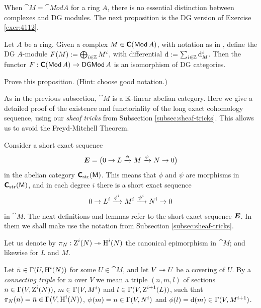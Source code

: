 When $\cat{M} = \cat{Mod} A$ for a ring $A$, there is no essential distinction 
between complexes and DG modules. The next proposition is the DG version of 
Exercise \ref{exer:4112}. 

\begin{prop} \label{prop:1065}
Let $A$ be a ring. Given a complex 
$M \in \boldsymbol{\mathsf{C}}(\operatorname{\mathsf{Mod}} A)$, with notation as in \tup{(\ref{eqn:1065})}, 
define the DG $A$-module 
$F(M) := \bigoplus_{i \in \mathbb{Z}} M^i$,
with differential $\mathrm{d} := \sum_{i \in \mathbb{Z}} \mathrm{d}_M^i$. Then the functor 
$F : \boldsymbol{\mathsf{C}}(\operatorname{\mathsf{Mod}} A) \to \operatorname{\mathsf{DGMod}} A$
is an isomorphism of DG categories. 
\end{prop}

\begin{exer}
Prove this proposition. (Hint: choose good notation.)
\end{exer}




\label{subsec:long-cohom-seq}

As in the previous subsection, $\cat{M}$ is a $\mathbb{K}$-linear 
abelian category. Here we give a detailed proof of the existence and 
functoriality of the long exact cohomology sequence, using our {\em sheaf 
tricks} from Subsection \ref{subsec:sheaf-tricks}. This allows us to avoid the 
Freyd-Mitchell Theorem. 

Consider a short exact sequence
\begin{equation} \label{eqn:3640}
\boldsymbol{E} = \bigl( 0 \to L \xrightarrow{\phi} M \xrightarrow{\psi} N \to 0 \bigr)
\end{equation}
in the abelian category $\boldsymbol{\mathsf{C}}_{\mathrm{str}}(\operatorname{\mathsf{M}})$. 
This means that $\phi$ and $\psi$ are morphisms in 
$\boldsymbol{\mathsf{C}}_{\mathrm{str}}(\operatorname{\mathsf{M}})$, and in each degree $i$ there is a short 
exact sequence 
\[ 0 \to L^i \xrightarrow{\phi^i} M^i \xrightarrow{\psi^i} N^i \to 0 \]
in $\cat{M}$. The next definitions and lemmas refer to the short exact 
sequence $\boldsymbol{E}$. In them we shall make use the notation from 
Subsection \ref{subsec:sheaf-tricks}.

Let us denote by
$\pi_N : \operatorname{Z}^i(N) \twoheadrightarrow \operatorname{H}^i(N)$
the canonical epimorphism in $\cat{M}$; and likewise for $L$ and $M$. 

\begin{dfn} \label{dfn:3645}
Let $\bar{n} \in \Gamma(U, \operatorname{H}^i(N))$ for some $U \in \cat{M}$,
and let $V \twoheadrightarrow U$ be a covering of $U$. 
By a {\em connecting triple} for $\bar{n}$ over $V$
we mean a triple $(n, m, l)$ of sections
$n \in \Gamma(V, \operatorname{Z}^i(N))$, 
$m \in \Gamma(V, M^i)$ and $l \in \Gamma(V, \operatorname{Z}^{i + 1}(L))$,
such that
$\pi_N(n) = \bar{n} \in \Gamma(V, \operatorname{H}^i(N))$, 
$\psi(m) = n \in \Gamma(V, N^i)$
and
$\phi(l) = \mathrm{d}(m) \in  \Gamma(V, M^{i + 1})$.
\end{dfn}

